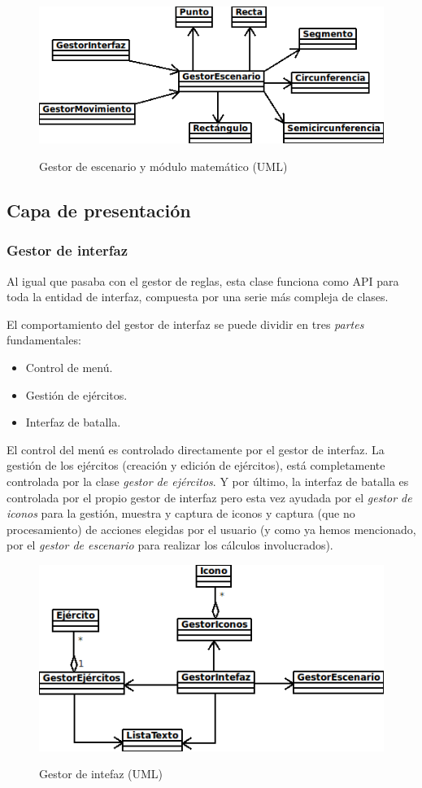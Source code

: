 \begin{figure}[h]
\centering
\includegraphics[scale=.8]{./imagenes/Escenario.png}
\label{fig:escenario}
\caption{Gestor de escenario y módulo matemático (UML)}
\end{figure}

\subsection{Capa de presentación}
\subsubsection{Gestor de interfaz}
Al igual que pasaba con el gestor de reglas, esta clase funciona como
API para toda la entidad de interfaz, compuesta por una serie más
compleja de clases.

El comportamiento del gestor de interfaz se puede dividir en tres
\emph{partes} fundamentales:
\begin{itemize}
\item Control de menú.
\item Gestión de ejércitos.
\item Interfaz de batalla.
\end{itemize}

El control del menú es controlado directamente por el gestor de
interfaz. La gestión de los ejércitos (creación y edición de
ejércitos), está completamente controlada por la clase \emph{gestor de
  ejércitos}. Y por último, la interfaz de batalla es controlada por
el propio gestor de interfaz pero esta vez ayudada por el \emph{gestor
  de iconos} para la gestión, muestra y captura de iconos y captura
(que no procesamiento) de acciones elegidas por el usuario (y como ya
hemos mencionado, por el \emph{gestor de escenario} para realizar los
cálculos involucrados).

\begin{figure}[h]
\centering
\includegraphics[scale=.8]{./imagenes/Interfaz.png}
\label{fig:interfaz}
\caption{Gestor de intefaz (UML)}
\end{figure}


